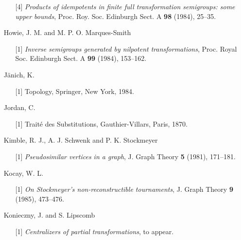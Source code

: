 \documentclass{surv-l}
\numberwithin{equation}{section}
\numberwithin{table}{section}
\numberwithin{figure}{section}
\theoremstyle{definition}
\begin{document}
\begin{enumerate}
\begin{enumerate}
\item[\hypertarget{bib31c}{[4]}] \emph{Products of idempotents in finite full
transformation semigroups: some upper bounds}, Proc. Roy.
Soc. Edinburgh Sect. A \textbf{98} (1984), 25--35.
\end{enumerate}

\item[] Howie, J. M. and M. P. O. Marques-Smith
\begin{enumerate}
\item[\hypertarget{bib32}{[1]}] \emph{Inverse semigroups generated by nilpotent
transformations}, Proc. Royal Soc. Edinburgh Sect. A
\textbf{99} (1984), 153--162.
\end{enumerate}

\item[] J\"{a}nich, K.
\begin{enumerate}
\item[\hypertarget{bib33}{[1]}] Topology, Springer, New York, 1984.
\end{enumerate}

\item[] Jordan, C.
\begin{enumerate}
\item[\hypertarget{bib34}{[1]}] Trait\'{e} des Substitutions, Gauthier-Villars, Paris,
1870.
\end{enumerate}

\item[] Kimble, R. J., A. J. Schwenk and P. K. Stockmeyer
\begin{enumerate}
\item[\hypertarget{bib35}{[1]}] \emph{Pseudosimilar vertices in a graph}, J.
Graph Theory \textbf{5} (1981), 171--181.
\end{enumerate}

\item[] Kocay, W. L.
\begin{enumerate}
\item[\hypertarget{bib36}{[1]}] \emph{On Stockmeyer's non-reconstructible
tournaments}, J. Graph Theory \textbf{9} (1985), 473--476.
\end{enumerate}

\item[] Konieczny, J. and S. Lipscomb
\begin{enumerate}
\item[\hypertarget{bib37}{[1]}] \emph{Centralizers of partial transformations}, to appear.


\end{enumerate}
\end{enumerate}
\end{document}

